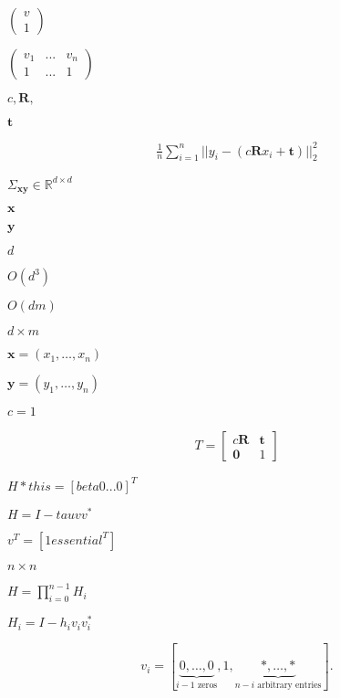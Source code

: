 \documentclass{article}
\begin{document}
$ \left( \begin{array}{c} v\\ 1 \end{array} \right) $
\pagebreak

$ \left( \begin{array}{ccc} v_1 & ... & v_n\\ 1 & ... & 1 \end{array} \right) $
\pagebreak

$ c, \mathbf{R}, $
\pagebreak

$ \mathbf{t} $
\pagebreak

\begin{align*} \frac{1}{n} \sum_{i=1}^n \vert\vert y_i - (c\mathbf{R}x_i + \mathbf{t}) \vert\vert_2^2 \end{align*}
\pagebreak

$ \Sigma_{\mathbf{x}\mathbf{y}} \in \mathbb{R}^{d \times d} $
\pagebreak

$ \mathbf{x} $
\pagebreak

$ \mathbf{y} $
\pagebreak

$d$
\pagebreak

$O(d^3)$
\pagebreak

$O(dm)$
\pagebreak

$d \times m$
\pagebreak

$ \mathbf{x} = \left( x_1, \hdots, x_n \right) $
\pagebreak

$ \mathbf{y} = \left( y_1, \hdots, y_n \right) $
\pagebreak

$ c=1 $
\pagebreak

\begin{align*} T = \begin{bmatrix} c\mathbf{R} & \mathbf{t} \\ \mathbf{0} & 1 \end{bmatrix} \end{align*}
\pagebreak

$ H *this = [ beta 0 ... 0]^T $
\pagebreak

$ H = I - tau v v^*$
\pagebreak

$ v^T = [1 essential^T] $
\pagebreak

$ n \times n $
\pagebreak

$ H = \prod_{i=0}^{n-1} H_i $
\pagebreak

$ H_i = I - h_i v_i v_i^* $
\pagebreak

\[ v_i = [\underbrace{0, \ldots, 0}_{i-1\mbox{ zeros}}, 1, \underbrace{*, \ldots,*}_{n-i\mbox{ arbitrary entries}} ]. \]
\pagebreak
\end{document}
